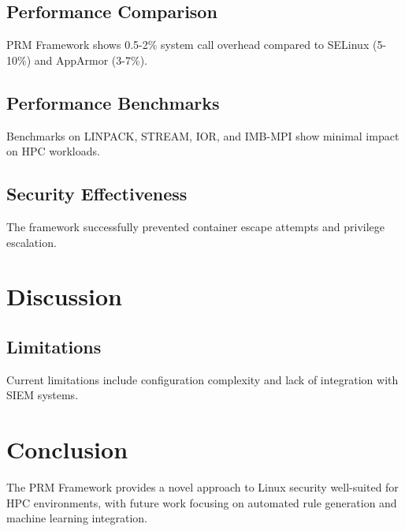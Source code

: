 \documentclass{article}
\begin{document}
\subsection{Performance Comparison}
PRM Framework shows 0.5-2\% system call overhead compared to SELinux (5-10\%) and AppArmor (3-7\%).

\subsection{Performance Benchmarks}
Benchmarks on LINPACK, STREAM, IOR, and IMB-MPI show minimal impact on HPC workloads.

\subsection{Security Effectiveness}
The framework successfully prevented container escape attempts and privilege escalation.

\section{Discussion}
\subsection{Limitations}
Current limitations include configuration complexity and lack of integration with SIEM systems.

\section{Conclusion}
The PRM Framework provides a novel approach to Linux security well-suited for HPC environments, with future work focusing on automated rule generation and machine learning integration.
\end{document}
